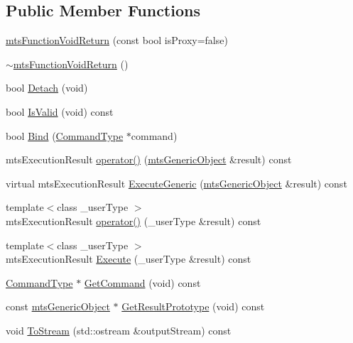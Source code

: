 \subsection*{Public Member Functions}
\begin{DoxyCompactItemize}
\item 
\hyperlink{classmts_function_void_return_ac88980814ca105a13e9e55f2cc58552e}{mts\+Function\+Void\+Return} (const bool is\+Proxy=false)
\item 
\hyperlink{classmts_function_void_return_ab86bbd4fba441a1ff0a722c7206c3e8b}{$\sim$mts\+Function\+Void\+Return} ()
\item 
bool \hyperlink{classmts_function_void_return_ab3bed9416ad22e74a269e1dd0dc07939}{Detach} (void)
\item 
bool \hyperlink{classmts_function_void_return_a179912ed4fd3487b9c274be8db16d822}{Is\+Valid} (void) const 
\item 
bool \hyperlink{classmts_function_void_return_af70fd93635a9e7ef6598f2a942687ab5}{Bind} (\hyperlink{classmts_function_void_return_a8aa3dea44f20057e4f47cbb20de87365}{Command\+Type} $\ast$command)
\item 
mts\+Execution\+Result \hyperlink{classmts_function_void_return_a20cb1b9dd5699e284c833b8d2a3cbca8}{operator()} (\hyperlink{classmts_generic_object}{mts\+Generic\+Object} \&result) const 
\item 
virtual mts\+Execution\+Result \hyperlink{classmts_function_void_return_a326e9b07fe307efd929ca04acf624459}{Execute\+Generic} (\hyperlink{classmts_generic_object}{mts\+Generic\+Object} \&result) const 
\item 
{\footnotesize template$<$class \+\_\+user\+Type $>$ }\\mts\+Execution\+Result \hyperlink{classmts_function_void_return_a96e91f6c4e5c36bc1e5b2c9ccb6dce07}{operator()} (\+\_\+user\+Type \&result) const 
\item 
{\footnotesize template$<$class \+\_\+user\+Type $>$ }\\mts\+Execution\+Result \hyperlink{classmts_function_void_return_a4c0db584b129d6306efa05f9ee54c2bb}{Execute} (\+\_\+user\+Type \&result) const 
\item 
\hyperlink{classmts_function_void_return_a8aa3dea44f20057e4f47cbb20de87365}{Command\+Type} $\ast$ \hyperlink{classmts_function_void_return_a8287972a864682bc1b94353ec747afc5}{Get\+Command} (void) const 
\item 
const \hyperlink{classmts_generic_object}{mts\+Generic\+Object} $\ast$ \hyperlink{classmts_function_void_return_acf66115c744df69c96b04f1c8c1c1d36}{Get\+Result\+Prototype} (void) const 
\item 
void \hyperlink{classmts_function_void_return_a7ed10b567427fe11d5b10cbb17f5e4fc}{To\+Stream} (std\+::ostream \&output\+Stream) const 
\end{DoxyCompactItemize}
